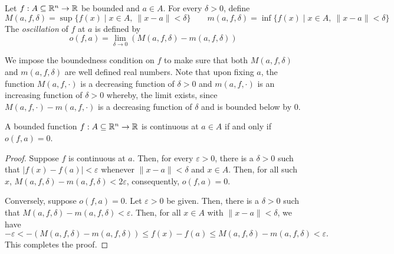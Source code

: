 \begin{definition}[Oscillation]
    Let $f:A\subseteq\mathbb{R}^n\to\mathbb{R}$ be bounded and $a\in A$. For every $\delta > 0$, define 
    \begin{equation*}
        M(a,f,\delta) = \sup\{f(x)\mid x\in A,~\|x - a\| < \delta\}\qquad
        m(a,f,\delta) = \inf\{f(x)\mid x\in A,~\|x - a\| < \delta\}
    \end{equation*}
    The \emph{oscillation} of $f$ at $a$ is defined by 
    \begin{equation*}
        o(f,a) = \lim_{\delta\to0}(M(a,f,\delta) - m(a,f,\delta))
    \end{equation*}
\end{definition}

We impose the boundedness condition on $f$ to make sure that both $M(a,f,\delta)$ and $m(a,f,\delta)$ are well defined real numbers. Note that upon fixing $a$, the function $M(a,f,\cdot)$ is a decreasing function of $\delta > 0$ and $m(a,f,\cdot)$ is an increasing function of $\delta > 0$ whereby, the limit exists, since $M(a,f,\cdot) - m(a,f,\cdot)$ is a decreasing function of $\delta$ and is bounded below by $0$.

\begin{proposition}
    A bounded function $f: A\subseteq\mathbb{R}^n\to\mathbb{R}$ is continuous at $a\in A$ if and only if $o(f,a) = 0$.
\end{proposition}
\begin{proof}
    Suppose $f$ is continuous at $a$. Then, for every $\varepsilon > 0$, there is a $\delta>0$ such that $|f(x) - f(a)| < \varepsilon$ whenever $\|x - a\| < \delta$ and $x\in A$. Then, for all such $x$, $M(a,f,\delta) - m(a,f,\delta) < 2\varepsilon$, consequently, $o(f,a) = 0$.

    Conversely, suppose $o(f,a) = 0$. Let $\varepsilon > 0$ be given. Then, there is a $\delta > 0$ such that  $M(a,f,\delta) - m(a,f,\delta) < \varepsilon$. Then, for all $x\in A$ with $\|x - a\| < \delta$, we have 
    \begin{equation*}
        -\varepsilon < -(M(a,f,\delta) - m(a,f,\delta))\le f(x) - f(a)\le M(a,f,\delta) - m(a,f,\delta) < \varepsilon.
    \end{equation*}
    This completes the proof.
\end{proof}

